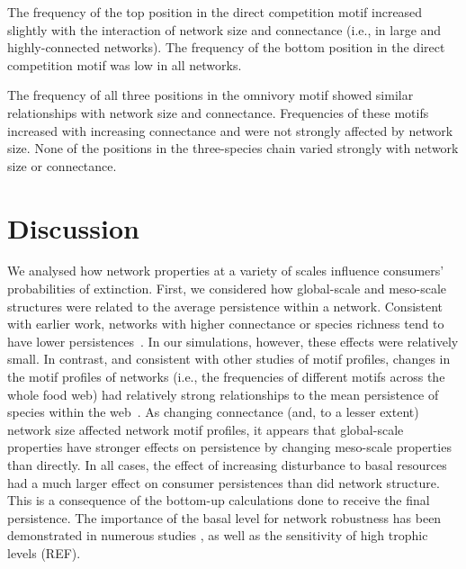 \documentclass[12pt]{article}
\begin{document}
\begin{spacing}{2.0}
            
            The frequency of the top position in the direct competition motif increased slightly with the interaction of network size and connectance (i.e., in large and highly-connected networks).
            The frequency of the bottom position in the direct competition motif was low in all networks.
            
            
            The frequency of all three positions in the omnivory motif showed similar relationships with network size and connectance.
            Frequencies of these motifs increased with increasing connectance and were not strongly affected by network size.
            None of the positions in the three-species chain varied strongly with network size or connectance.
            
 


\section*{Discussion}


We analysed how network properties at a variety of scales influence consumers' probabilities of extinction.
First, we considered how global-scale and meso-scale structures were related to the average persistence within a network.
Consistent with earlier work, networks with higher connectance or species richness tend to have lower persistences~\citep{}.
In our simulations, however, these effects were relatively small.
In contrast, and consistent with other studies of motif profiles, changes in the motif profiles of networks (i.e., the frequencies of different motifs across the whole food web) had relatively strong relationships to the mean persistence of species within the web~\citep{prill2005dynamic, bascompte2005simple}.
As changing connectance (and, to a lesser extent) network size 
affected network motif profiles, it appears that global-scale properties have stronger effects on persistence by changing meso-scale properties than directly.
In all cases, the effect of increasing disturbance to basal resources had a much larger effect on consumer persistences than did network structure.
This is a consequence of the bottom-up calculations done to receive the final persistence. The importance of the basal level for network robustness has been demonstrated in numerous studies \citep{scherber2010bottom}, as well as the sensitivity of high trophic levels (REF).



\end{spacing}
\end{document}
